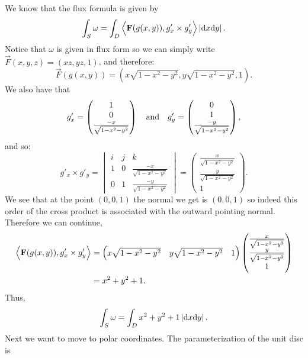 \documentclass[11pt,a4paper]{article}
\begin{document}
\begin{solution}
  We know that the flux formula is given by
  \[
    \int_{S} \omega =
    \int_{D} \ip{\vec F(g(x,y))}{g'_x \times g'_y} \abs{\dx \dy}.
  \]
  Notice that $\omega$ is given in flux form so we can simply write
  $\vec F(x,y,z) = (xz,yz,1)$,
  and therefore:
  \[
    \vec F(g(x,y)) =
    (x \sqrt{1 - x^2 - y^2},y \sqrt{1 - x^2 - y^2},1).
  \]
  We also have that
  \[
    g'_x =
    \begin{pmatrix}
      1 \\ 0 \\ \frac{-x}{\sqrt{1 - x^2 - y^2}}
    \end{pmatrix} \quad \text{and} \quad
    g'_y =
    \begin{pmatrix}
      0 \\ 1 \\ \frac{-y}{\sqrt{1 - x^2 - y^2}}
    \end{pmatrix},
  \]
  and so:
  \[
    g'_x \times g'_y =
    \begin{vmatrix}
      i & j & k \\
      1 & 0 & \frac{-x}{\sqrt{1 - x^2 - y^2}} \\
      0 & 1 & \frac{-y}{\sqrt{1 - x^2 - y^2}}
    \end{vmatrix} =
    \begin{pmatrix}
      \frac{x}{\sqrt{1 - x^2 - y^2}} \\ \frac{y}{\sqrt{1 - x^2 - y^2}} \\ 1
    \end{pmatrix}.
  \]
  We see that at the point $(0,0,1)$ the normal we get is
  $(0,0,1)$ so indeed this order of the cross product is associated
  with the outward pointing normal. Therefore we can continue,
  \begin{align*}
    \left\langle \boldsymbol{\mathbf{F}}(g(x,y)), g'_x \times g'_y \right\rangle &=
    \begin{pmatrix}
      x \sqrt{1 - x^2 - y^2} & y \sqrt{1 - x^2 - y^2} & 1
    \end{pmatrix}
    \begin{pmatrix}
      \frac{x}{\sqrt{1 - x^2 - y^2}} \\ \frac{y}{\sqrt{1 - x^2 - y^2}} \\ 1
    \end{pmatrix} \\ &=
    x^2 + y^2 + 1.
  \end{align*}
  Thus,
  \[
    \int_S \omega =
    \int_D x^2 + y^2 + 1 \abs{\dx \dy}.
  \]
  Next we want to move to polar coordinates.
  The parameterization of the unit disc is

\end{solution}
\end{document}
